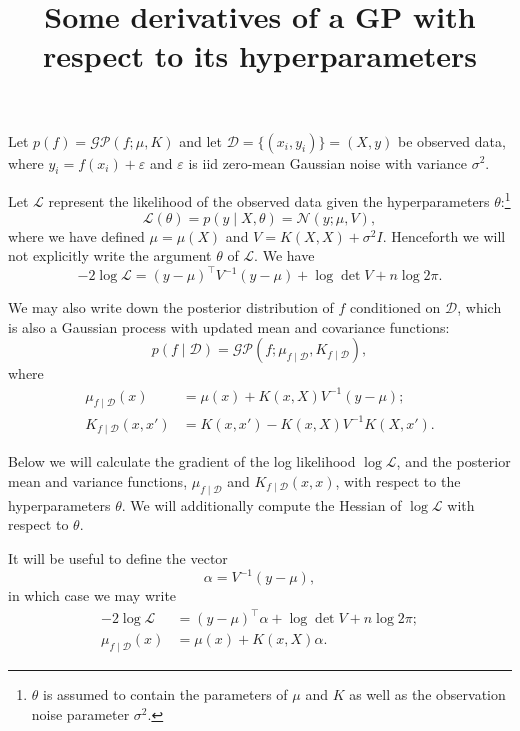 \documentclass{article}
\title{Some derivatives of a GP with respect to its hyperparameters}
\date{}
\newcommand{\given}{\mid}
\newcommand{\cm}[1]{\mathcal{#1}}
\newcommand{\data}{\cm{D}}
\newcommand{\LL}{\cm{L}}
\newcommand{\trans}{^{\top}}
\newcommand{\inv}{^{-1}}
\begin{document}
\maketitle

Let $p(f) = \cm{GP}(f; \mu, K)$ and let $\data = \bigl\lbrace (x_i,
y_i) \bigr\rbrace = (X, y)$ be observed data, where $y_i = f(x_i) +
\varepsilon$ and $\varepsilon$ is iid zero-mean Gaussian noise with
variance $\sigma^2$.

Let $\LL$ represent the likelihood of the observed data given the
hyperparameters $\theta$:\footnote{$\theta$ is assumed to contain the
  parameters of $\mu$ and $K$ as well as the observation noise
  parameter $\sigma^2$.}
\begin{equation*}
  \LL(\theta)
  =
  p(y \given X, \theta)
  =
  \cm{N}(y; \mu, V),
\end{equation*}
where we have defined $\mu = \mu(X)$ and $V = K(X, X) + \sigma^2 I$.
Henceforth we will not explicitly write the argument $\theta$ of
$\LL$. We have
\begin{equation}
  -2\log \LL
  =
  (y - \mu)\trans V\inv (y - \mu) + \log\det V + n \log 2\pi.
  \label{log_likelihood}
\end{equation}

We may also write down the posterior distribution of $f$ conditioned
on $\data$, which is also a Gaussian process with updated mean and
covariance functions:
\begin{equation*}
  p(f \given \data) = \cm{GP}(f; \mu_{f \given \data}, K_{f \given \data}),
\end{equation*}
where
\begin{align}
  \mu_{f \given \data}(x) &= \mu(x) + K(x, X)V\inv(y - \mu);
  \label{posterior_mean}
  \\
  K_{f \given \data}(x, x') &= K(x, x') - K(x, X)V\inv K(X, x').
  \label{posterior_covariance}
\end{align}

Below we will calculate the gradient of the log likelihood $\log \LL$,
and the posterior mean and variance functions, $\mu_{f \given
  \data}$ and $K_{f \given \data}(x, x)$, with respect to the
hyperparameters $\theta$.  We will additionally compute the Hessian of
$\log \LL$ with respect to $\theta$.

It will be useful to define the vector
\begin{equation*}
  \alpha = V^{-1} (y - \mu),
\end{equation*}
in which case we may write
\begin{align*}
  -2\log \LL
  &=
  (y - \mu)\trans \alpha + \log\det V + n \log 2\pi;
  \\
  \mu_{f \given \data}(x)
  &=
  \mu(x) + K(x, X)\alpha.
\end{align*}
\end{document}
